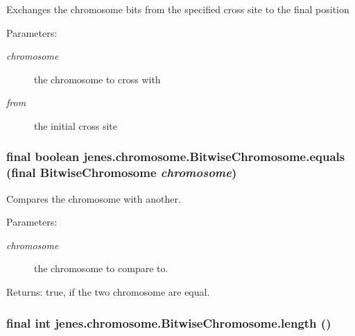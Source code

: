 Exchanges the chromosome bits from the specified cross site to the final position

\begin{Desc}
\item[Parameters:]
\begin{description}
\item[{\em chromosome}]the chromosome to cross with \item[{\em from}]the initial cross site \end{description}
\end{Desc}
\hypertarget{classjenes_1_1chromosome_1_1_bitwise_chromosome_41c9858f7ef05194011d1e227fea3584}{
\subsubsection[equals]{\setlength{\rightskip}{0pt plus 5cm}final boolean jenes.chromosome.BitwiseChromosome.equals (final {\bf BitwiseChromosome} {\em chromosome})}}
\label{classjenes_1_1chromosome_1_1_bitwise_chromosome_41c9858f7ef05194011d1e227fea3584}


Compares the chromosome with another.

\begin{Desc}
\item[Parameters:]
\begin{description}
\item[{\em chromosome}]the chromosome to compare to. \end{description}
\end{Desc}
\begin{Desc}
\item[Returns:]true, if the two chromosome are equal. \end{Desc}
\hypertarget{classjenes_1_1chromosome_1_1_bitwise_chromosome_0da8899c89f8b1f222526acf1d2e8519}{
\subsubsection[length]{\setlength{\rightskip}{0pt plus 5cm}final int jenes.chromosome.BitwiseChromosome.length ()}}
\label{classjenes_1_1chromosome_1_1_bitwise_chromosome_0da8899c89f8b1f222526acf1d2e8519}


